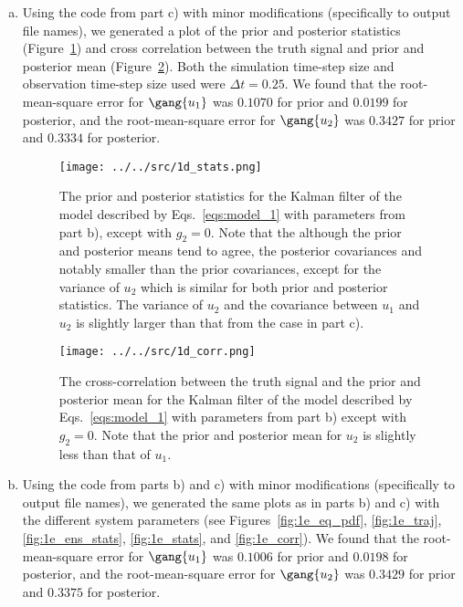 \begin{enumerate}[a)]
	\item Using the code from part c) with minor modifications (specifically to output file names), we generated a plot of the prior and posterior statistics (Figure~\ref{fig:1d_stats}) and cross correlation between the truth signal and prior and posterior mean (Figure~\ref{fig:1d_corr}). Both the simulation time-step size and observation time-step size used were $\Delta t = 0.25$. We found that the root-mean-square error for $\gang{u_1}$ was $0.1070$ for prior and $0.0199$ for posterior, and the root-mean-square error for $\gang{u_2}$ was $0.3427$ for prior and $0.3334$ for posterior.
	
	\begin{figure}[H]
		\centering
		\texttt{[image: ../../src/1d\_stats.png]}
		\caption{The prior and posterior statistics for the Kalman filter of the model described by Eqs.~\ref{eqs:model_1} with parameters from part b), except with $g_2 = 0$. Note that the although the prior and posterior means tend to agree, the posterior covariances and notably smaller than the prior covariances, except for the variance of $u_2$ which is similar for both prior and posterior statistics. The variance of $u_2$ and the covariance between $u_1$ and $u_2$ is slightly larger than that from the case in part c).}
		\label{fig:1d_stats}
	\end{figure}
	
	\begin{figure}[H]
		\centering
		\texttt{[image: ../../src/1d\_corr.png]}
		\caption{The cross-correlation between the truth signal and the prior and posterior mean for the Kalman filter of the model described by Eqs.~\ref{eqs:model_1} with parameters from part b) except with $g_2 = 0$. Note that the prior and posterior mean for $u_2$ is slightly less than that of $u_1$.}
		\label{fig:1d_corr}
	\end{figure}
	
	\item Using the code from parts b) and c) with minor modifications (specifically to output file names), we generated the same plots as in parts b) and c) with the different system parameters (see Figures~\ref{fig:1e_eq_pdf}, \ref{fig:1e_traj}, \ref{fig:1e_ens_stats}, \ref{fig:1e_stats}, and \ref{fig:1e_corr}). We found that the root-mean-square error for $\gang{u_1}$ was $0.1006$ for prior and $0.0198$ for posterior, and the root-mean-square error for $\gang{u_2}$ was $0.3429$ for prior and $0.3375$ for posterior.
	

\end{enumerate}
